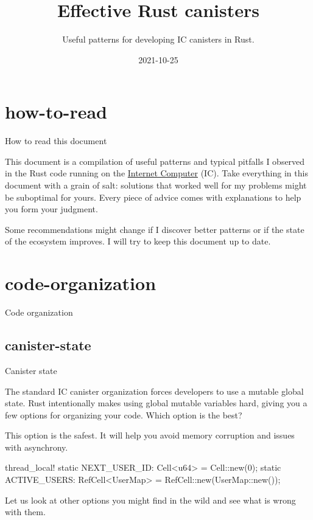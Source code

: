 \documentclass{article}
\title{Effective Rust canisters}
\subtitle{Useful patterns for developing IC canisters in Rust.}
\date{2021-10-25}
\begin{document}
\section{how-to-read}{How to read this document}

This document is a compilation of useful patterns and typical pitfalls I observed in the Rust code running on the \href{https://internetcomputer.org/}{Internet Computer} (IC).
Take everything in this document with a grain of salt: solutions that worked well for my problems might be suboptimal for yours.
Every piece of advice comes with explanations to help you form your judgment.

Some recommendations might change if I discover better patterns or if the state of the ecosystem improves.
I will try to keep this document up to date.

\section{code-organization}{Code organization}
\subsection{canister-state}{Canister state}

The standard IC canister organization forces developers to use a mutable global state.
Rust intentionally makes using global mutable variables hard, giving you a few options for organizing your code.
Which option is the best?


This option is the safest.
It will help you avoid memory corruption and issues with asynchrony.

\begin{code}[good]
thread_local! {
    static NEXT_USER_ID: Cell<u64> = Cell::new(0);
    static ACTIVE_USERS: RefCell<UserMap> = RefCell::new(UserMap::new());
}
\end{code}

Let us look at other options you might find in the wild and see what is wrong with them.
\end{document}
